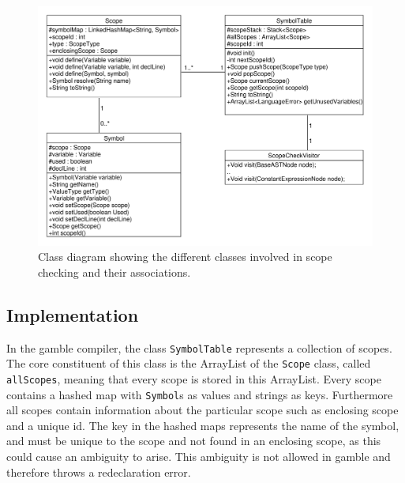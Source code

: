 \begin{figure}
\centering
\includegraphics[width=1\textwidth]{figures/ClassDiagrams/ScopeCheck.pdf}
\caption{Class diagram showing the different classes involved in scope checking and their associations.}
\label{fig:scopeCheck}
\end{figure}
\vspace{-15pt}

\subsection*{Implementation}
In the \gls{gamble} compiler, the class \texttt{SymbolTable} represents a collection of scopes.
The core constituent of this class is the ArrayList of the \texttt{Scope} class, called \texttt{allScopes}, meaning that every scope is stored in this ArrayList.
Every scope contains a hashed map with \texttt{Symbol}s as values and strings as keys.
Furthermore all scopes contain information about the particular scope such as enclosing scope and a unique id. 
The key in the hashed maps represents the name of the symbol, and must be unique to the scope and not found in an enclosing scope, as this could cause an ambiguity to arise.
This ambiguity is not allowed in \gls{gamble} and therefore throws a redeclaration error.

